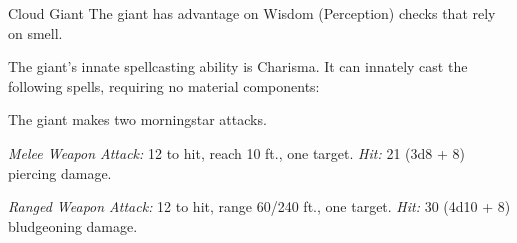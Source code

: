 \documentclass[10pt,a4paper,twoside,bg=print,twocolumn,openany,nodeprecatedcode]{dndbook}
\begin{document}
\begin{DndMonster}[float=t]{Cloud Giant}
\DndMonsterBasics[
armor-class = {14 (natural armor)},
hit-points = {\DndDice{16d12 + 96}},
speed = {40 ft.}
]
\DndMonsterAbilityScores[
 str = 27,
 dex = 10,
 con = 22,
 int = 12,
 wis = 16,
 cha = 16
]
\DndMonsterDetails[
saving-throws = {Con +10, Wis +7, Cha +7},
skills = {Insight +7, Perception +7},
languages = {Common, Giant},
challenge = 9,
]
The giant has advantage on Wisdom (Perception) checks that rely on smell.

The giant's innate spellcasting ability is Charisma. It can innately cast the following spells, requiring no material components:
\begin{DndMonsterSpells}
\end{DndMonsterSpells}
The giant makes two morningstar attacks.

\textsl{Melee Weapon Attack:} 12 to hit, reach 10 ft., one target. \textsl{Hit:} 21 (3d8 + 8) piercing damage.

\textsl{Ranged Weapon Attack:} 12 to hit, range 60/240 ft., one target. \textsl{Hit:} 30 (4d10 + 8) bludgeoning damage.

\end{DndMonster}
\end{document}
